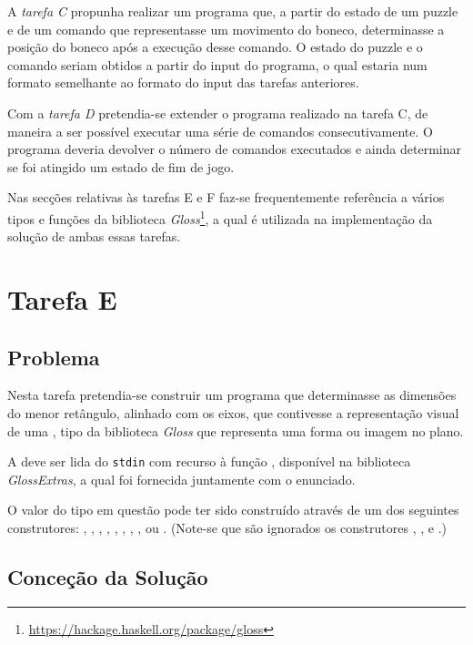 \documentclass[a4paper]{article}
\begin{document}
A \emph{tarefa C} propunha realizar um programa que, a partir do estado de um puzzle e de um comando que representasse um movimento do boneco, determinasse a posição do boneco após a execução desse comando. O estado do puzzle e o comando seriam obtidos a partir do input do programa, o qual estaria num formato semelhante ao formato do input das tarefas anteriores.

Com a \emph{tarefa D} pretendia-se extender o programa realizado na tarefa C, de maneira a ser possível executar uma série de comandos consecutivamente. O programa deveria devolver o número de comandos executados e ainda determinar se foi atingido um estado de fim de jogo.

\bigskip

Nas secções relativas às tarefas E e F faz-se frequentemente referência a vários tipos e funções da biblioteca \textit{Gloss}\footnote{\url{https://hackage.haskell.org/package/gloss}}, a qual é utilizada na implementação da solução de ambas essas tarefas.

\section{Tarefa E}

\subsection{Problema}

Nesta tarefa pretendia-se construir um programa que determinasse as dimensões do menor retângulo, alinhado com os eixos, que contivesse a representação visual de uma , tipo da biblioteca \textit{Gloss} que representa uma forma ou imagem no plano.

A  deve ser lida do \texttt{stdin} com recurso à função , disponível na biblioteca \textit{GlossExtras}, a qual foi fornecida juntamente com o enunciado.

O valor do tipo  em questão pode ter sido construído através de um dos seguintes construtores: , , , , , , , ,  ou . (Note-se que são ignorados os construtores , ,  e .)

\subsection{Conceção da Solução}
\label{sec:tarefaEconc}
\end{document}

